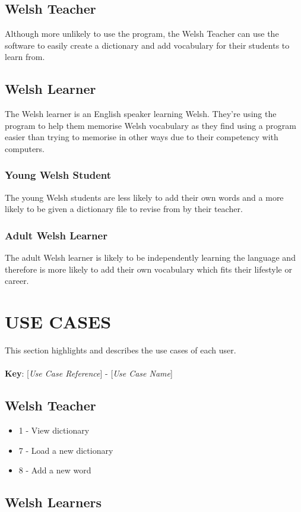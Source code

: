 \documentclass{project}
\begin{document}
\subsection{Welsh Teacher}
Although more unlikely to use the program, the Welsh Teacher can use the software to easily create a dictionary and add vocabulary for their students to learn from.
\subsection{Welsh Learner}
The Welsh learner is an English speaker learning Welsh. They're using the program to help them memorise Welsh vocabulary as they find using a program easier than trying to memorise in other ways due to their competency with computers.
\subsubsection{Young Welsh Student}
The young Welsh students are less likely to add their own words and a more likely to be given a dictionary file to revise from by their teacher.
\subsubsection{Adult Welsh Learner}
The adult Welsh learner is likely to be independently learning the language and therefore is more likely to add their own vocabulary which fits their lifestyle or career.

\section{USE CASES}
This section highlights and describes the use cases of each user.
\\
\\
\textbf{Key}: [\textit{Use Case Reference}] - [\textit{Use Case Name}]
\subsection{Welsh Teacher}
\begin{itemize}
	\item 1 - View dictionary
	\item 7 - Load a new dictionary
	\item 8 - Add a new word
\end{itemize}

\subsection{Welsh Learners}
\end{document}
